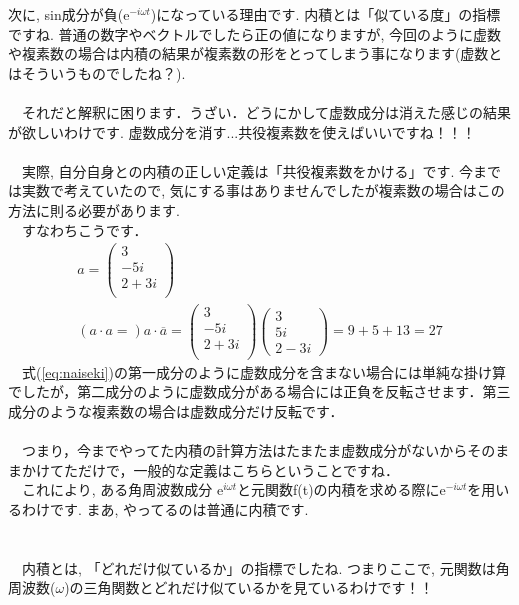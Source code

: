 \documentclass[11pt,a4paper]{ujreport} 	%
\begin{document}
次に, sin成分が負($\mathrm{e}^{-i\omega t}$)になっている理由です. 内積とは「似ている度」の指標ですね. 普通の数字やベクトルでしたら正の値になりますが, 今回のように虚数や複素数の場合は内積の結果が複素数の形をとってしまう事になります(虚数とはそういうものでしたね？).\\
\\
　それだと解釈に困ります．うざい．どうにかして虚数成分は消えた感じの結果が欲しいわけです. 虚数成分を消す...共役複素数を使えばいいですね！！！\\
\\
　実際, 自分自身との内積の正しい定義は「共役複素数をかける」です. 今までは実数で考えていたので, 気にする事はありませんでしたが複素数の場合はこの方法に則る必要があります.\\
　すなわちこうです．
\begin{eqnarray}
a = \left(\begin{array}{cc}3\\ -5i\\ 2+3i\\ \end{array} \right) \nonumber \\
(a \cdot a = )a \cdot \overline{a} = \left(\begin{array}{cc}3\\ -5i\\ 2+3i\\ \end{array} \right)\left(\begin{array}{cc}3\\ 5i\\ 2-3i \end{array} \right) = 9 + 5 + 13= 27
\label{eq:naiseki}
\end{eqnarray}
　式(\ref{eq:naiseki})の第一成分のように虚数成分を含まない場合には単純な掛け算でしたが，第二成分のように虚数成分がある場合には正負を反転させます．第三成分のような複素数の場合は虚数成分だけ反転です．\\
\\
　つまり，今までやってた内積の計算方法はたまたま虚数成分がないからそのままかけてただけで，一般的な定義はこちらということですね．
\\
　これにより, ある角周波数成分 $\mathrm{e}^{i\omega t}$と元関数f(t)の内積を求める際に$\mathrm{e}^{-i\omega t}$を用いるわけです. まあ, やってるのは普通に内積です.\\
\\
\\
　内積とは, 「どれだけ似ているか」の指標でしたね. つまりここで, 元関数は角周波数($\omega$)の三角関数とどれだけ似ているかを見ているわけです！！\\\\
\end{document}
